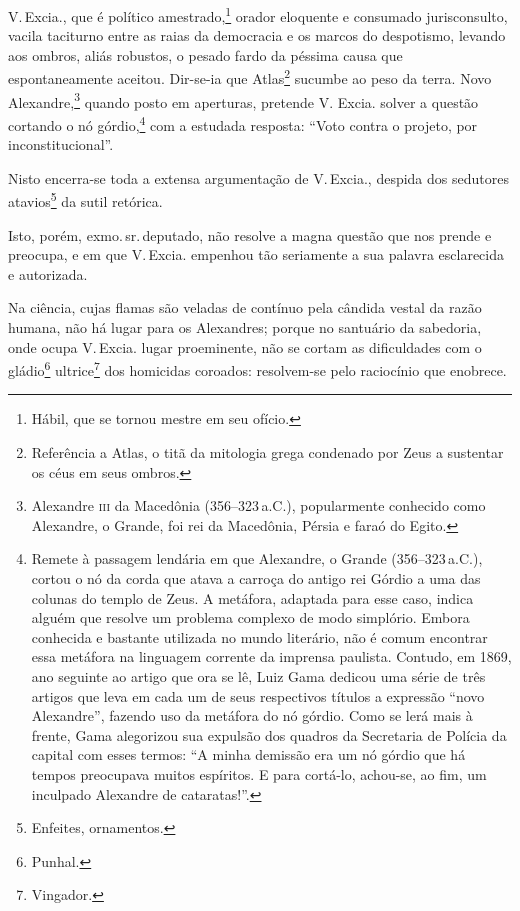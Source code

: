 V.\,Excia., que é político amestrado,\footnote{Hábil, que se tornou
  mestre em seu ofício.} orador eloquente e consumado jurisconsulto,
vacila taciturno entre as raias da democracia e os marcos do despotismo,
levando aos ombros, aliás robustos, o pesado fardo da péssima causa que
espontaneamente aceitou. Dir-se-ia que Atlas\footnote{Referência a
  Atlas, o titã da mitologia grega condenado por Zeus a sustentar os
  céus em seus ombros.} sucumbe ao peso da terra. Novo
Alexandre,\footnote{Alexandre \textsc{iii} da Macedônia (356--323\,a.C.),
  popularmente conhecido como Alexandre, o Grande, foi rei da Macedônia,
  Pérsia e faraó do Egito.} quando posto em aperturas, pretende V.
Excia. solver a questão cortando o nó górdio,\footnote{Remete à
  passagem lendária em que Alexandre, o Grande (356--323\,a.C.), cortou o
  nó da corda que atava a carroça do antigo rei Górdio a uma das colunas
  do templo de Zeus. A metáfora, adaptada para esse caso, indica alguém
  que resolve um problema complexo de modo simplório. Embora conhecida e
  bastante utilizada no mundo literário, não é comum encontrar essa
  metáfora na linguagem corrente da imprensa paulista. Contudo, em 1869,
  ano seguinte ao artigo que ora se lê, Luiz Gama dedicou uma série de
  três artigos que leva em cada um de seus respectivos títulos a
  expressão ``novo Alexandre'', fazendo uso da metáfora do nó górdio. Como
  se lerá mais à frente, Gama alegorizou sua expulsão dos quadros da
  Secretaria de Polícia da capital com esses termos: ``A minha demissão
  era um nó górdio que há tempos preocupava muitos espíritos. E para
  cortá-lo, achou-se, ao fim, um inculpado Alexandre de cataratas!''.\label{gordio}}
com a estudada resposta: ``Voto contra o projeto, por inconstitucional''.

Nisto encerra-se toda a extensa argumentação de V.\,Excia., despida dos
sedutores atavios\footnote{Enfeites, ornamentos.} da sutil retórica.

Isto, porém, exmo.\,sr.\,deputado, não resolve a magna questão que nos
prende e preocupa, e em que V.\,Excia. empenhou tão seriamente a sua
palavra esclarecida e autorizada.

Na ciência, cujas flamas são veladas de contínuo pela cândida vestal da
razão humana, não há lugar para os Alexandres; porque no santuário da
sabedoria, onde ocupa V.\,Excia. lugar proeminente, não se cortam as
dificuldades com o gládio\footnote{Punhal.} ultrice\footnote{
  Vingador.} dos homicidas coroados: resolvem-se pelo raciocínio que
enobrece.


